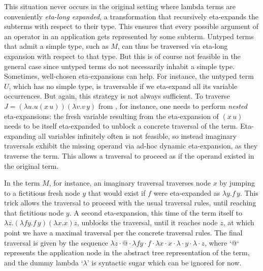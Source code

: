 \documentclass[xchauthor,chkrefs,GCNS,amsmath,amsthm,rotating,leaveRGB]{tcsg}
\theoremstyle{plain}
\theoremstyle{definition}
\begin{document}
This situation never occurs in the original setting where lambda terms are
conveniently \emph{eta-long expanded}, a transformation that recursively
eta-expands the subterms with respect to their type. This ensures that every
possible argument of an operator in an application gets represented by some
subterm. Untyped terms that admit a simple type, such as $M$, can thus be
traversed via eta-long expansion with respect to that type. But this is of
course not feasible in the general case since untyped terms do not
necessarily inhabit a simple type. Sometimes, well-chosen eta-expansions can
help. For instance, the untyped term $U$, which has no simple type, is
traversable if we eta-expand all its variable occurrences. But again, this
strategy is not always sufficient. To traverse $J = (\lambda u . u(x\, u))
(\lambda v . v\, y)$ from , for
instance, one needs to perform \emph{nested} eta-expansions: the fresh
variable resulting from the eta-expansion of $(x\, u)$ needs to be itself
eta-expanded to unblock a concrete traversal of the term. Eta-expanding all
variables infinitely often is not feasible, so instead imaginary traversals
exhibit the missing operand via ad-hoc dynamic eta-expansion, as they
traverse the term. This allows a traversal to proceed as if the operand
existed in the original term.

In the term $M$, for instance, an imaginary traversal traverses node $x$ by
jumping to a fictitious fresh node $y$ that would exist if $f$ were
eta-expanded as $\lambda y.f\, y$. This trick allows the traversal to proceed
with the usual traversal rules, until reaching that fictitious node $y$. A
second eta-expansion, this time of the term itself to $\lambda z. (\lambda f
y.f\, y)(\lambda x.x) z$, unblocks the traversal, until it reaches node $z$,
at which point we have a maximal traversal per the concrete traversal rules.
The final traversal is given by the sequence $\lambda z \cdot @ \cdot \lambda
f y \cdot f \cdot \lambda x \cdot x \cdot \lambda \cdot y \cdot \lambda \cdot
z$, where `@` represents the application node in the abstract tree
representation of the term, and the dummy lambda `$\lambda $' is syntactic
sugar which can be ignored for now.
\end{document}
